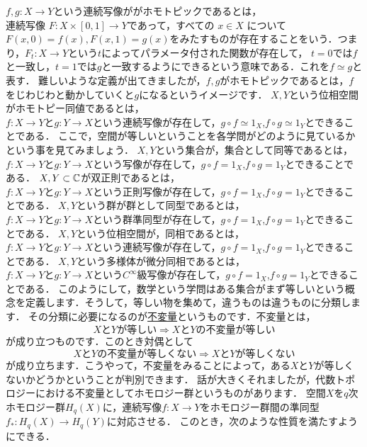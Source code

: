 $f,g:X\to Y$という連続写像ががホモトピックであるとは，\\
連続写像 $F : X \times [0, 1] \to Y$であって，すべての $x \in X$ について$ F(x, 0) = f(x), F(x, 1) = g(x) $をみたすものが存在することをいう．つまり，$F_t :X\to Y$という$t$によってパラメータ付された関数が存在して，
$t=0$では$f$と一致し，$t=1$では$g$と一致するようにできるという意味である．これを$f\simeq g$と表す．
難しいような定義が出てきましたが，$f,g$がホモトピックであるとは，$f$をじわじわと動かしていくと$g$になるというイメージです．
$X,Y$という位相空間がホモトピー同値であるとは，\\
$f:X\to Y$と$g:Y\to X$という連続写像が存在して，$g \circ f \simeq 1_X$,$f \circ g \simeq 1_Y$とできることである．
ここで，空間が等しいということを各学問がどのように見ているかという事を見てみましょう．
$X,Y$という集合が，集合として同等であるとは，\\
$f:X\to Y$と$g:Y\to X$という写像が存在して，$g \circ f = 1_X$,$f \circ g = 1_Y$とできることである．
{}
$X,Y \subset \mathbb C$が双正則であるとは，\\
$f:X\to Y$と$g:Y\to X$という正則写像が存在して，$g \circ f = 1_X$,$f \circ g = 1_Y$とできることである．
{}
$X,Y$という群が群として同型であるとは，\\
$f:X\to Y$と$g:Y\to X$という群準同型が存在して，$g \circ f = 1_X$,$f \circ g = 1_Y$とできることである．
{}
$X,Y$という位相空間が，同相であるとは，\\
$f:X\to Y$と$g:Y\to X$という連続写像が存在して，$g \circ f = 1_X$,$f \circ g = 1_Y$とできることである．
{}
$X,Y$という多様体が微分同相であるとは，\\
$f:X\to Y$と$g:Y\to X$という$C^\infty$級写像が存在して，$g \circ f = 1_X$,$f \circ g = 1_Y$とできることである．
このようにして，数学という学問はある集合がまず等しいという概念を定義します．そうして，等しい物を集めて，違うものは違うものに分類します． その分類に必要になるのが\underline{不変量}というものです．不変量とは，
\[
X と Y が等しい \Rightarrow XとYの不変量が等しい
\]
が成り立つものです．このとき対偶として
\[
 XとYの不変量が等しくない \Rightarrow X と Y が等しくない
\]
が成り立ちます．こうやって，不変量をみることによって，ある$X$と$Y$が等しくないかどうかということが判別できます．
話が大きくそれましたが，代数トポロジーにおける不変量としてホモロジー群というものがあります．
空間$X$を$q$次ホモロジー群$H_q(X)$に，連続写像$f:X\to Y$をホモロジー群間の準同型$f_* : H_q(X) \to H_q(Y)$に対応させる．
このとき，次のような性質を満たすようにできる．\\
